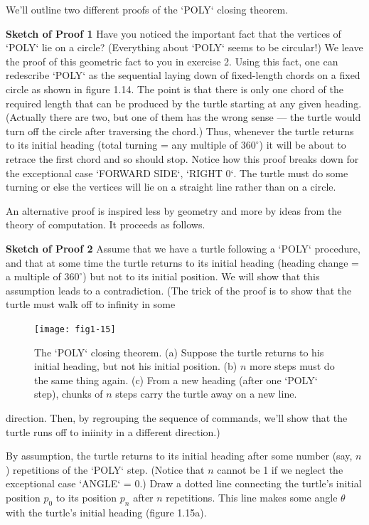 \documentclass{book}
\begin{document}
We'll outline two different proofs of the \textsc{`POLY`} closing theorem.

\textbf{Sketch of Proof 1} Have you noticed the important fact that the vertices
of \textsc{`POLY`} lie on a circle? (Everything about \textsc{`POLY`} seems to be circular!) We leave the proof of this geometric fact to you in exercise 2. Using this fact, one can redescribe \textsc{`POLY`} as the sequential laying down of fixed-length chords on a fixed circle as shown in figure 1.14. The point is that
there is only one chord of the required length that can be produced by
the turtle starting at any given heading. (Actually there are two, but
one of them has the wrong sense --- the turtle would turn off the circle
after traversing the chord.) Thus, whenever the turtle returns to its
initial heading (total turning = any multiple of $360^{\circ}$) it will be about to
retrace the first chord and so should stop. Notice how this proof breaks
down for the exceptional case \textsc{`FORWARD SIDE`}, \textsc{`RIGHT 0`}. The turtle must
do some turning or else the vertices will lie on a straight line rather than
on a circle.

An alternative proof is inspired less by geometry and more by ideas
from the theory of computation. It proceeds as follows.

\textbf{Sketch of Proof 2} Assume that we have a turtle following a \textsc{`POLY`} procedure, and that at some time the turtle returns to its initial heading
(heading change = a multiple of $360^{\circ}$) but not to its initial position. We
will show that this assumption leads to a contradiction. (The trick of
the proof is to show that the turtle must walk off to infinity in some

\begin{figure}
\begin{center}
\texttt{[image: fig1-15]}
\caption{The \textsc{`POLY`} closing theorem. (a) Suppose the turtle returns to his initial heading, but not his initial position. (b) $n$ more steps must do the same thing again. (c) From a new heading (after one \textsc{`POLY`} step), chunks of $n$ steps carry the turtle away on a new line.}
\end{center}
\end{figure}

direction. Then, by regrouping the sequence of commands, we'll show
that the turtle runs off to iniinity in a different direction.)

\indent
By assumption, the turtle returns to its initial heading after some
number (say, $n$) repetitions of the \textsc{`POLY`} step. (Notice that $n$ cannot
be 1 if we neglect the exceptional case \textsc{`ANGLE`} = 0.) Draw a dotted
line connecting the turtle's initial position $p_0$ to its position $p_n$ after $n$
repetitions. This line makes some angle $\theta$ with the turtle's initial heading
(figure 1.15a).
\end{document}
